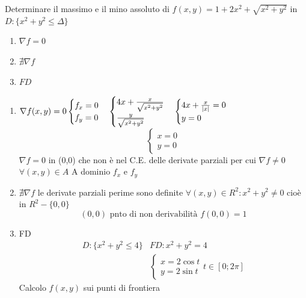 \begin{esempio}
	Determinare il massimo e il mino assoluto di $f(x,y)=
	1+2x^2+\sqrt{x^2+y^2}$ in $D:\{x^2+y^2\leq \Delta\}$
	\begin{enumerate}
		\item $\nabla f=0$
		\item $\nexists \nabla f$
		\item $FD$
	\end{enumerate}
	\begin{enumerate}
		\item $\nabla f(x,y)=0\begin{cases}
				f_x=0\\
				f_y=0
		\end{cases}\begin{cases}
			4x+\frac{x}{\sqrt{x^2+y^2}}\\
			\frac{y}{\sqrt{x^2+y^2}}
		\end{cases}\begin{cases}
			4x+\frac{x}{\lvert x\rvert}=0\\
			y=0
		\end{cases}$
		\begin{equation*}
			\begin{cases}
				x=0\\
				y=0
			\end{cases}
		\end{equation*}
			$\nabla f=0$ in (0,0) che non è nel C.E. delle derivate parziali
			per cui $\nabla f \neq 0$ $\forall (x,y)\in A$ A dominio $f_x$ e
			$f_y$
		\item $\nexists \nabla f$ le derivate parziali perime sono definite
			$\forall (x,y)\in R^2:x^2+y^2\neq 0$ cioè in $R^2-\{0,0\}$
			\begin{equation*}
				(0,0) \text{ pnto di non derivabilità } f(0,0)=1
			\end{equation*}
		\item FD
			\begin{equation*}
				\begin{matrix}
					D:\{x^2+y^2\leq 4\} & FD: x^2+y^2=4\\
					& \begin{cases}
						x=2\cos t \\
						y=2\sin t
					\end{cases} t\in [0;2\pi]
				\end{matrix}
			\end{equation*}
			Calcolo $f(x,y)$ sui punti di frontiera
			\begin{equation*}

\end{equation*}
\end{enumerate}
\end{esempio}
